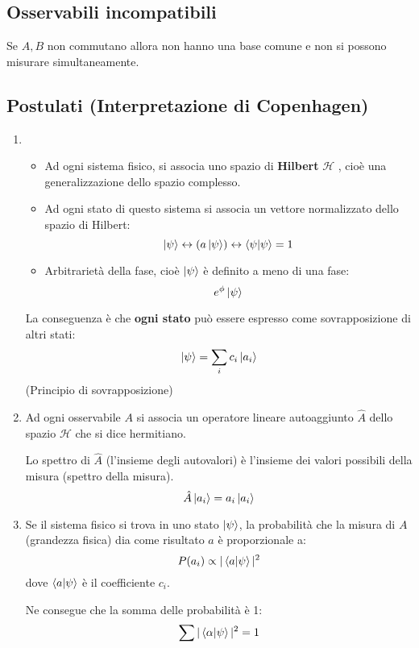 \documentclass[a4paper]{article}
\begin{document}
\subsection{Osservabili incompatibili}
Se \( A,B \) non commutano allora non hanno una base comune e non si possono misurare
simultaneamente.

\subsection{Postulati (Interpretazione di Copenhagen)}
\begin{enumerate}
  \item 
    \begin{itemize}
      \item 
        Ad ogni sistema fisico, si associa uno spazio di \textbf{Hilbert} \( \mathcal{H} \) , cioè una
        generalizzazione dello spazio complesso.
      \item 
        Ad ogni stato di questo sistema si associa un vettore normalizzato dello spazio di
        Hilbert:
        \[
          \ket{\psi} \leftrightarrow \left( a \ket{\psi } \right) \leftrightarrow \braket{\psi} = 1
        \] 
      \item Arbitrarietà della fase, cioè \( \ket{\psi} \) è definito a meno di una fase:
        \[
           e^\phi \ket{\psi}
        \]
    \end{itemize}
    La conseguenza è che \textbf{ogni stato} può essere espresso come sovrapposizione di
    altri stati:
    \[
      \ket{\psi} = \sum_i c_i \ket{a_i}
    \] 
    (Principio di sovrapposizione)

  \item Ad ogni osservabile \( A \) si associa un operatore lineare autoaggiunto \( \hat{A} \)
    dello spazio \( \mathcal{H} \)  che si dice hermitiano.

    Lo spettro di \( \hat{A} \) (l'insieme degli autovalori) è l'insieme dei valori
    possibili della misura (spettro della misura).
    \[
      \hat{A} \ket{a_i} = a_i \ket{a_i}
    \] 

  \item Se il sistema fisico si trova in uno stato \( \ket{\psi } \), la probabilità che
    la misura di \( A \) (grandezza fisica) dia come risultato \( a \) è proporzionale a:
    \[
      P(a_i) \propto |\braket{a}{\psi}|^2
    \] 
    dove \( \braket{a}{\psi} \) è il coefficiente \( c_i \).

    Ne consegue che la somma delle probabilità è 1:
    \[
      \sum |\braket{\alpha}{\psi}|^2 = 1
    \] 


\end{enumerate}
\end{document}
